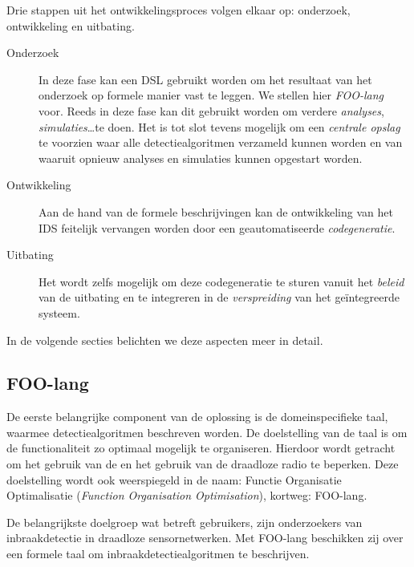 Drie stappen uit het ontwikkelingsproces volgen elkaar op: onderzoek,
ontwikkeling en uitbating.

\begin{description}

    \item[Onderzoek] In deze fase kan een DSL gebruikt worden om het resultaat
    van het onderzoek op formele manier vast te leggen. We stellen hier
    \emph{FOO-lang} voor. Reeds in deze fase kan dit gebruikt worden om verdere
    \emph{analyses}, \emph{simulaties}\dots te doen. Het is tot slot tevens
    mogelijk om een \emph{centrale opslag} te voorzien waar alle
    detectiealgoritmen verzameld kunnen worden en van waaruit opnieuw analyses
    en simulaties kunnen opgestart worden.
    
    \item[Ontwikkeling] Aan de hand van de formele beschrijvingen kan de
    ontwikkeling van het IDS feitelijk vervangen worden door een
    geautomatiseerde \emph{codegeneratie}.
    
    \item[Uitbating] Het wordt zelfs mogelijk om deze codegeneratie te sturen
    vanuit het \emph{beleid} van de uitbating en te integreren in de
    \emph{verspreiding} van het ge\"integreerde systeem.
    
\end{description}

\noindent In de volgende secties belichten we deze aspecten meer in detail.

\subsection{FOO-lang}
\label{subsection:arch-foo-lang}

De eerste belangrijke component van de oplossing is de domeinspecifieke taal,
waarmee detectiealgoritmen beschreven worden. De doelstelling van de taal is om
de functionaliteit zo optimaal mogelijk te organiseren. Hierdoor wordt getracht
om het gebruik van de \mcu en het gebruik van de draadloze radio te beperken.
Deze doelstelling wordt ook weerspiegeld in de naam: Functie Organisatie
Optimalisatie (\emph{Function Organisation Optimisation}), kortweg: FOO-lang.

De belangrijkste doelgroep wat betreft gebruikers, zijn onderzoekers van
inbraakdetectie in draadloze sensornetwerken. Met FOO-lang beschikken zij over
een formele taal om inbraakdetectiealgoritmen te beschrijven.

